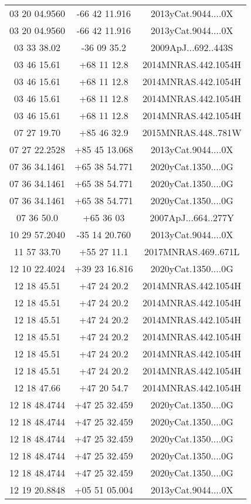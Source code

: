 \begin{table}
\begin{tabular}{ccc}
03 20 04.9560 & -66 42 11.916 & 2013yCat.9044....0X \\
03 20 04.9560 & -66 42 11.916 & 2013yCat.9044....0X \\
03 33 38.02 & -36 09 35.2 & 2009ApJ...692..443S \\
03 46 15.61 & +68 11 12.8 & 2014MNRAS.442.1054H \\
03 46 15.61 & +68 11 12.8 & 2014MNRAS.442.1054H \\
03 46 15.61 & +68 11 12.8 & 2014MNRAS.442.1054H \\
03 46 15.61 & +68 11 12.8 & 2014MNRAS.442.1054H \\
07 27 19.70 & +85 46 32.9 & 2015MNRAS.448..781W \\
07 27 22.2528 & +85 45 13.068 & 2013yCat.9044....0X \\
07 36 34.1461 & +65 38 54.771 & 2020yCat.1350....0G \\
07 36 34.1461 & +65 38 54.771 & 2020yCat.1350....0G \\
07 36 34.1461 & +65 38 54.771 & 2020yCat.1350....0G \\
07 36 50.0 & +65 36 03 & 2007ApJ...664..277Y \\
10 29 57.2040 & -35 14 20.760 & 2013yCat.9044....0X \\
11 57 33.70 & +55 27 11.1 & 2017MNRAS.469..671L \\
12 10 22.4024 & +39 23 16.816 & 2020yCat.1350....0G \\
12 18 45.51 & +47 24 20.2 & 2014MNRAS.442.1054H \\
12 18 45.51 & +47 24 20.2 & 2014MNRAS.442.1054H \\
12 18 45.51 & +47 24 20.2 & 2014MNRAS.442.1054H \\
12 18 45.51 & +47 24 20.2 & 2014MNRAS.442.1054H \\
12 18 45.51 & +47 24 20.2 & 2014MNRAS.442.1054H \\
12 18 45.51 & +47 24 20.2 & 2014MNRAS.442.1054H \\
12 18 47.66 & +47 20 54.7 & 2014MNRAS.442.1054H \\
12 18 48.4744 & +47 25 32.459 & 2020yCat.1350....0G \\
12 18 48.4744 & +47 25 32.459 & 2020yCat.1350....0G \\
12 18 48.4744 & +47 25 32.459 & 2020yCat.1350....0G \\
12 18 48.4744 & +47 25 32.459 & 2020yCat.1350....0G \\
12 18 48.4744 & +47 25 32.459 & 2020yCat.1350....0G \\
12 19 20.8848 & +05 51 05.004 & 2013yCat.9044....0X \\

\end{tabular}
\end{table}
